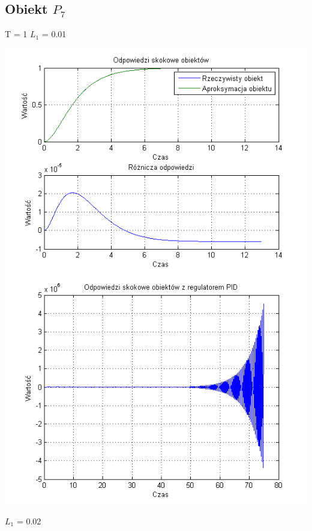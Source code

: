 \documentclass[10pt,a4paper]{article}
\begin{document}
\subsection{Obiekt $P_7$}
T = 1
$L_1$ = 0.01
\begin{center}
\includegraphics[scale=1]{images/dwa/skrypt_153.png}\\
\includegraphics[scale=1]{images/dwa/skrypt_154.png}\\
\end{center}
\newpage
$L_1$ = 0.02
\end{document}
